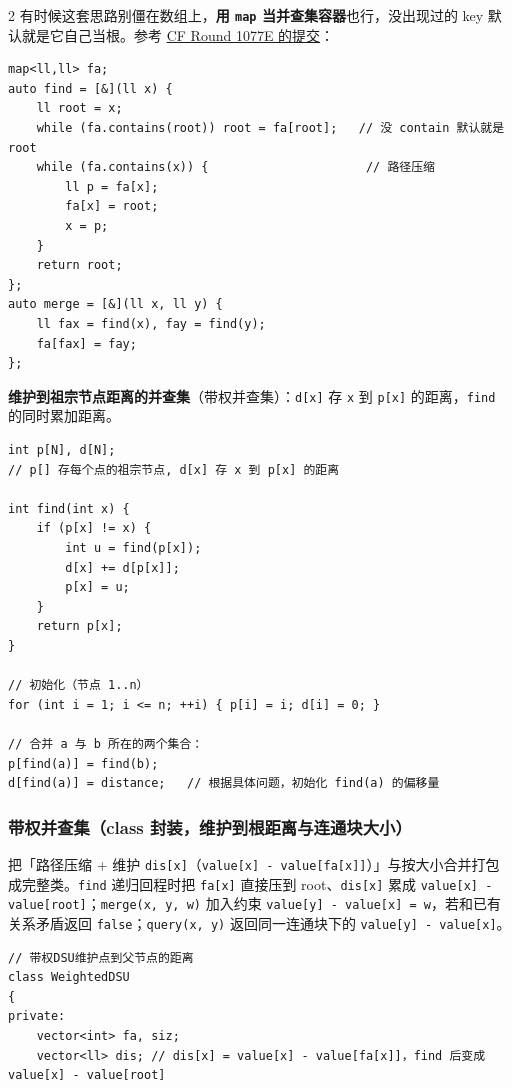 \begin{multicols*}{2}
		有时候这套思路别僵在数组上，\textbf{用 \texttt{map} 当并查集容器}也行，没出现过的 key 默认就是它自己当根。参考 \href{https://codeforces.com/contest/2157/submission/355136647}{CF Round 1077E 的提交}：

		\begin{verbatim}
map<ll,ll> fa;
auto find = [&](ll x) {
    ll root = x;
    while (fa.contains(root)) root = fa[root];   // 没 contain 默认就是 root
    while (fa.contains(x)) {                      // 路径压缩
        ll p = fa[x];
        fa[x] = root;
        x = p;
    }
    return root;
};
auto merge = [&](ll x, ll y) {
    ll fax = find(x), fay = find(y);
    fa[fax] = fay;
};
		\end{verbatim}

		\textbf{维护到祖宗节点距离的并查集}（带权并查集）：\texttt{d[x]} 存 \texttt{x} 到 \texttt{p[x]} 的距离，\texttt{find} 的同时累加距离。

		\begin{verbatim}
int p[N], d[N];
// p[] 存每个点的祖宗节点, d[x] 存 x 到 p[x] 的距离

int find(int x) {
    if (p[x] != x) {
        int u = find(p[x]);
        d[x] += d[p[x]];
        p[x] = u;
    }
    return p[x];
}

// 初始化（节点 1..n）
for (int i = 1; i <= n; ++i) { p[i] = i; d[i] = 0; }

// 合并 a 与 b 所在的两个集合：
p[find(a)] = find(b);
d[find(a)] = distance;   // 根据具体问题，初始化 find(a) 的偏移量
		\end{verbatim}


		\subsubsection{带权并查集（class 封装，维护到根距离与连通块大小）}

		把「路径压缩 + 维护 \texttt{dis[x]}（\texttt{value[x] - value[fa[x]]}）」与按大小合并打包成完整类。\texttt{find} 递归回程时把 \texttt{fa[x]} 直接压到 root、\texttt{dis[x]} 累成 \texttt{value[x] - value[root]}；\texttt{merge(x, y, w)} 加入约束 \texttt{value[y] - value[x] = w}，若和已有关系矛盾返回 \texttt{false}；\texttt{query(x, y)} 返回同一连通块下的 \texttt{value[y] - value[x]}。

		\begin{verbatim}
// 带权DSU维护点到父节点的距离
class WeightedDSU
{
private:
    vector<int> fa, siz;
    vector<ll> dis; // dis[x] = value[x] - value[fa[x]]，find 后变成 value[x] - value[root]


\end{verbatim}
\end{multicols*}
